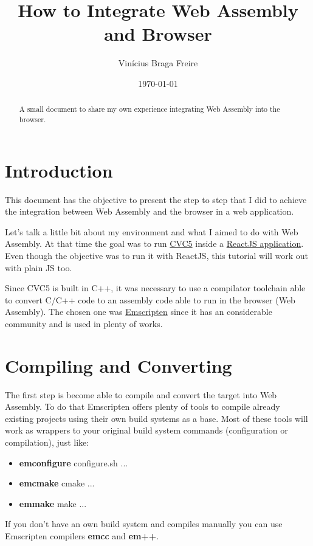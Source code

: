 \documentclass[12pt, a4paper]{article}
\title{How to Integrate Web Assembly and Browser}
\author{Vinícius Braga Freire}
\date{\today}
\begin{document}
\maketitle 

\begin{abstract}
    A small document to share my own experience integrating Web Assembly into the browser.
\end{abstract}


\section{Introduction}

This document has the objective to present the step to step that I did to achieve the integration between Web Assembly and the browser in a web application.

Let's talk a little bit about my environment and what I aimed to do with Web Assembly. At that time the goal was to run \href{https://cvc5.github.io/}{CVC5} inside a \href{https://ufmg-smite.github.io/proof-visualizer/}{ReactJS application}. Even though the objective was to run it with ReactJS, this tutorial will work out with plain JS too.

Since CVC5 is built in C++, it was necessary to use a compilator toolchain able to convert C/C++ code to an assembly code able to run in the browser (Web Assembly). The chosen one was \href{https://emscripten.org/}{Emscripten} since it has an considerable community and is used in plenty of works.

\section{Compiling and Converting}
The first step is become able to compile and convert the target into Web Assembly. To do that Emscripten offers plenty of tools to compile already existing projects using their own build systems as a base. Most of these tools will work as wrappers to your original build system commands (configuration or compilation), just like:
\begin{itemize}
    \item \textbf{emconfigure} configure.sh ...
    \item \textbf{emcmake} cmake ...
    \item \textbf{emmake} make ...
\end{itemize}

If you don't have an own build system and compiles manually you can use Emscripten compilers \textbf{emcc} and \textbf{em++}.
\end{document}
